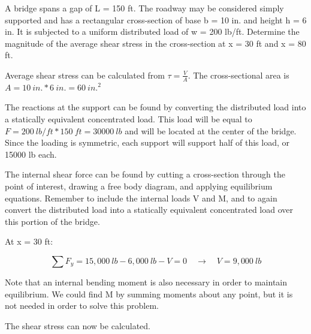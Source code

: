 \documentclass[
  letterpaper,
  DIV=11,
  numbers=noendperiod]{scrreprt}
\begin{document}
\begin{tcolorbox}[enhanced jigsaw, breakable, opacityback=0, toptitle=1mm, left=2mm, colback=white, opacitybacktitle=0.6, colframe=quarto-callout-tip-color-frame, titlerule=0mm, arc=.35mm, leftrule=.75mm, bottomtitle=1mm, colbacktitle=quarto-callout-tip-color!10!white, rightrule=.15mm, title={Example 2.3}, bottomrule=.15mm, toprule=.15mm, coltitle=black]

A bridge spans a gap of L = 150 ft. The roadway may be considered simply
supported and has a rectangular cross-section of base b = 10 in. and
height h = 6 in. It is subjected to a uniform distributed load of w =
200 lb/ft. Determine the magnitude of the average shear stress in the
cross-section at x = 30 ft and x = 80 ft.

\begin{tcolorbox}[enhanced jigsaw, breakable, opacityback=0, toptitle=1mm, left=2mm, colback=white, opacitybacktitle=0.6, colframe=quarto-callout-tip-color-frame, titlerule=0mm, arc=.35mm, leftrule=.75mm, bottomtitle=1mm, colbacktitle=quarto-callout-tip-color!10!white, rightrule=.15mm, title={Solution}, bottomrule=.15mm, toprule=.15mm, coltitle=black]

Average shear stress can be calculated from \(\tau=\frac{V}{A}\). The
cross-sectional area is \(A=10{~in.}*6{~in.}=60{~in.}^2\)

The reactions at the support can be found by converting the distributed
load into a statically equivalent concentrated load. This load will be
equal to \(F=200{~lb/ft}*150{~ft}=30000{~lb}\) and will be located at
the center of the bridge. Since the loading is symmetric, each support
will support half of this load, or 15000 lb each.

The internal shear force can be found by cutting a cross-section through
the point of interest, drawing a free body diagram, and applying
equilibrium equations. Remember to include the internal loads V and M,
and to again convert the distributed load into a statically equivalent
concentrated load over this portion of the bridge.

At x = 30 ft:

\[
\sum F_y=15,000{~lb}-6,000{~lb}-V=0 \quad \rightarrow \quad V=9,000{~lb}
\]

Note that an internal bending moment is also necessary in order to
maintain equilibrium. We could find M by summing moments about any
point, but it is not needed in order to solve this problem.

The shear stress can now be calculated.


\end{tcolorbox}
\end{tcolorbox}
\end{document}
